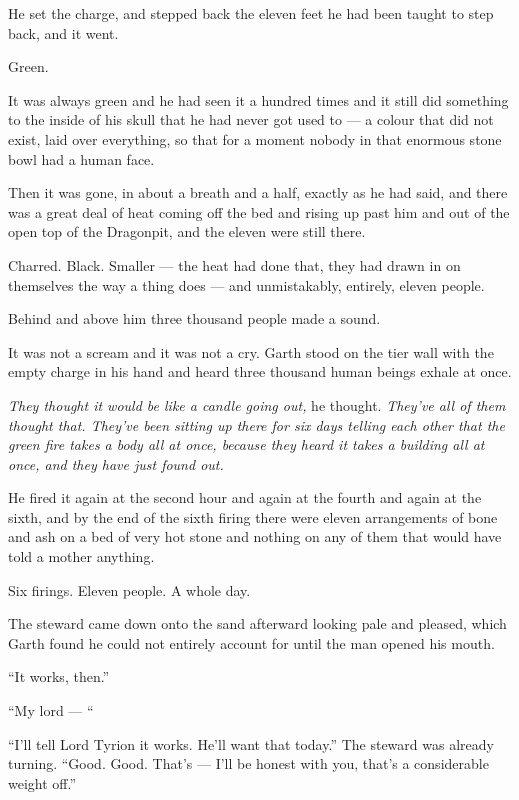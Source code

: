 He set the charge, and stepped back the eleven feet he had been taught to step back, and it went.

\sceneBreak

Green.

It was always green and he had seen it a hundred times and it still did something to the inside of his skull that he had never got used to — a colour that did not exist, laid over everything, so that for a moment nobody in that enormous stone bowl had a human face.

Then it was gone, in about a breath and a half, exactly as he had said, and there was a great deal of heat coming off the bed and rising up past him and out of the open top of the Dragonpit, and the eleven were still there.

Charred. Black. Smaller — the heat had done that, they had drawn in on themselves the way a thing does — and unmistakably, entirely, eleven people.

Behind and above him three thousand people made a sound.

It was not a scream and it was not a cry. Garth stood on the tier wall with the empty charge in his hand and heard three thousand human beings exhale at once.

\textit{They thought it would be like a candle going out,} he thought. \textit{They’ve all of them thought that. They’ve been sitting up there for six days telling each other that the green fire takes a body all at once, because they heard it takes a building all at once, and they have just found out.}

He fired it again at the second hour and again at the fourth and again at the sixth, and by the end of the sixth firing there were eleven arrangements of bone and ash on a bed of very hot stone and nothing on any of them that would have told a mother anything.

Six firings. Eleven people. A whole day.

\sceneBreak

The steward came down onto the sand afterward looking pale and pleased, which Garth found he could not entirely account for until the man opened his mouth.

“It works, then.”

“My lord — “

“I’ll tell Lord Tyrion it works. He’ll want that today.” The steward was already turning. “Good. Good. That’s — I’ll be honest with you, that’s a considerable weight off.”

